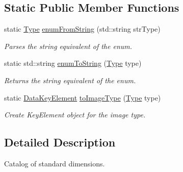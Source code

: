 \subsection*{Static Public Member Functions}
\begin{DoxyCompactItemize}
\item 
static \hyperlink{classBUSBOY_1_1ImageTypes_a3ce0616eb5317335a3b17bd46d56138b}{Type} \hyperlink{classBUSBOY_1_1ImageTypes_aa378a4b1cb7703b83c2c0c7eafbd8344}{enumFromString} (std::string strType)
\begin{DoxyCompactList}\small\item\em Parses the string equivalent of the enum. \item\end{DoxyCompactList}\item 
static std::string \hyperlink{classBUSBOY_1_1ImageTypes_ab6b89cbc0feb2e25f386660a8aefcbf4}{enumToString} (\hyperlink{classBUSBOY_1_1ImageTypes_a3ce0616eb5317335a3b17bd46d56138b}{Type} type)
\begin{DoxyCompactList}\small\item\em Returns the string equivalent of the enum. \item\end{DoxyCompactList}\item 
static \hyperlink{classBUSBOY_1_1DataKeyElement}{DataKeyElement} \hyperlink{classBUSBOY_1_1ImageTypes_a20db6862047c3fb93f4da985155ace43}{toImageType} (\hyperlink{classBUSBOY_1_1ImageTypes_a3ce0616eb5317335a3b17bd46d56138b}{Type} type)
\begin{DoxyCompactList}\small\item\em Create KeyElement object for the image type. \item\end{DoxyCompactList}\end{DoxyCompactItemize}


\subsection{Detailed Description}
Catalog of standard dimensions. 

